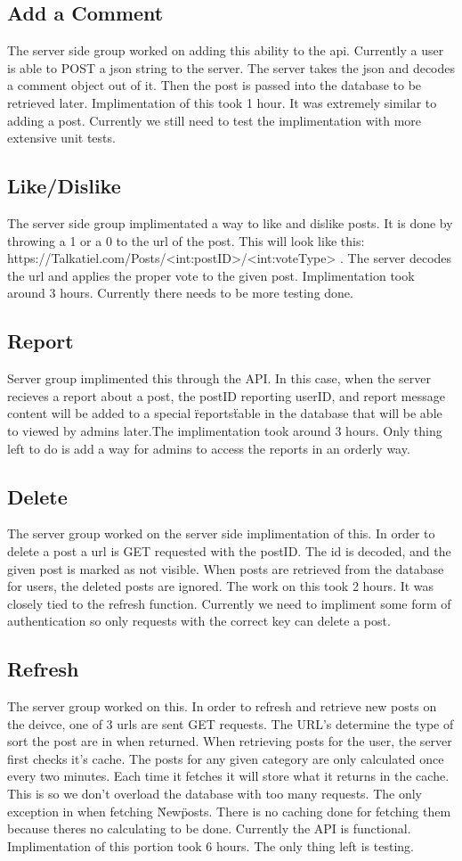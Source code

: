 \documentclass[12pt]{article}
\begin{document}
      \subsection{Add a Comment}
      The server side group worked on adding this ability to the api.  Currently a user is able to POST a json string to the server.  The server takes the json and decodes a comment object out of it.  Then the post is passed into the database to be retrieved later.  Implimentation of this took 1 hour.  It was extremely similar to adding a post.  Currently we still need to test the implimentation with more extensive unit tests.
      \subsection{Like/Dislike}
      The server side group implimentated a way to like and dislike posts.  It is done by throwing a 1 or a 0 to the url of the post.  This will look like this: https://Talkatiel.com/Posts/<int:postID>/<int:voteType> .  The server decodes the url and applies the proper vote to the given post.  Implimentation took around 3 hours.  Currently there needs to be more testing done.
      \subsection{Report}
      Server group implimented this through the API.  In this case, when the server recieves a report about a post, the postID reporting userID, and report message content will be added to a special \"reports\" table in the database that will be able to viewed by admins later.The implimentation took around 3 hours.  Only thing left to do is add a way for admins to access the reports in an orderly way.
      \subsection{Delete}
      The server group worked on the server side implimentation of this.  In order to delete a post a url is GET requested with the postID.  The id is decoded, and the given post is marked as not visible.  When posts are retrieved from the database for users, the deleted posts are ignored.  The work on this took 2 hours.  It was closely tied to the refresh function.  Currently we need to impliment some form of authentication so only requests with the correct key can delete a post.
      \subsection{Refresh}
      The server group worked on this.  In order to refresh and retrieve new posts on the deivce, one of 3 urls are sent GET requests.  The URL's determine the type of sort the post are in when returned.  When retrieving posts for the user, the server first checks it's cache.  The posts for any given category are only calculated once every two minutes.  Each time it fetches it will store what it returns in the cache.  This is so we don't overload the database with too many requests.  The only exception in when fetching \"New\" posts. There is no caching done for fetching them because theres no calculating to be done.  Currently the API is functional.  Implimentation of this portion took 6 hours.  The only thing left is testing.
\end{document}

